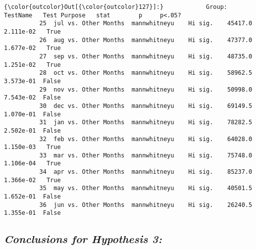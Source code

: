 \documentclass[11pt]{article}
\begin{document}
\begin{Verbatim}[commandchars=\\\{\}]
{\color{outcolor}Out[{\color{outcolor}127}]:}            Group:           TestName   Test Purpose   stat        p     p<.05?
          25  jul vs. Other Months  mannwhitneyu    Hi sig.    45417.0  2.111e-02   True
          26  aug vs. Other Months  mannwhitneyu    Hi sig.    47377.0  1.677e-02   True
          27  sep vs. Other Months  mannwhitneyu    Hi sig.    48735.0  1.251e-02   True
          28  oct vs. Other Months  mannwhitneyu    Hi sig.    58962.5  3.573e-01  False
          29  nov vs. Other Months  mannwhitneyu    Hi sig.    50998.0  7.543e-02  False
          30  dec vs. Other Months  mannwhitneyu    Hi sig.    69149.5  1.070e-01  False
          31  jan vs. Other Months  mannwhitneyu    Hi sig.    78282.5  2.502e-01  False
          32  feb vs. Other Months  mannwhitneyu    Hi sig.    64028.0  1.150e-03   True
          33  mar vs. Other Months  mannwhitneyu    Hi sig.    75748.0  1.106e-04   True
          34  apr vs. Other Months  mannwhitneyu    Hi sig.    85237.0  1.366e-02   True
          35  may vs. Other Months  mannwhitneyu    Hi sig.    40501.5  1.652e-01  False
          36  jun vs. Other Months  mannwhitneyu    Hi sig.    26240.5  1.355e-01  False
\end{Verbatim}
            
    \hypertarget{conclusions-for-hypothesis-3}{%
\subsection{\texorpdfstring{\textbf{\emph{Conclusions for Hypothesis
3:}}}{Conclusions for Hypothesis 3:}}\label{conclusions-for-hypothesis-3}}
\end{document}

